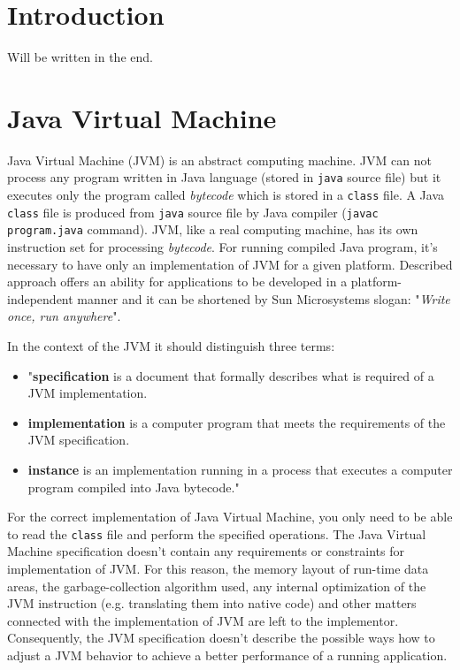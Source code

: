 \documentclass[
  digital, %
  oneside,
  notable, %
  nolof,     %
  nolot     %
]{fithesis3}
\begin{document}
\chapter{Introduction}
    Will be written in the end.

\chapter{Java Virtual Machine}

Java Virtual Machine (JVM) is an abstract computing machine. JVM can not process any program written in Java language (stored in \texttt{java} source file) but it executes only the program called \textit{bytecode} which is stored in a \texttt{class} file. A Java \texttt{class} file is produced from \texttt{java} source file by Java compiler (\texttt{javac program.java} command). JVM, like a real computing machine, has its own instruction set for processing \textit{bytecode}. For running compiled Java program, it's necessary to have only an implementation of JVM for a given platform. Described approach offers an ability for applications to be developed in a platform-independent manner and it can be shortened by Sun Microsystems slogan: "\textit{Write once, run anywhere}". \cite{spec}

In the context of the JVM it should distinguish three terms:
\begin{itemize}
	\item "\textbf{specification} is a document that formally describes what is required of a JVM implementation.
	\item \textbf{implementation} is a computer program that meets the requirements of the JVM specification.
	\item \textbf{instance} is an implementation running in a process that executes a computer program compiled into Java bytecode." \cite{brief}
\end{itemize}

For the correct implementation of Java Virtual Machine, you only need to be able to read the \texttt{class} file and perform the specified operations. The Java Virtual Machine specification doesn't contain any requirements or constraints for implementation of JVM. For this reason, the memory layout of run-time data areas, the garbage-collection algorithm used, any internal optimization of the JVM instruction (e.g. translating them into native code) and other matters connected with the implementation of JVM are left to the implementor. Consequently, the JVM specification doesn't describe the possible ways how to adjust a JVM behavior to achieve a better performance of a running application. \cite{spec}
\end{document}
